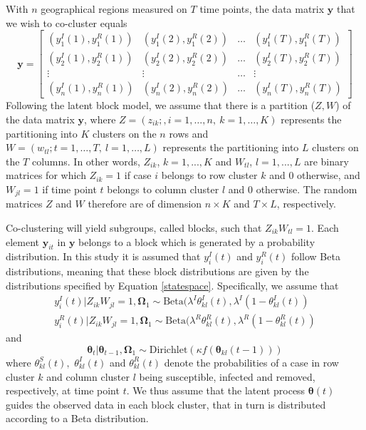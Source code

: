 \documentclass[10pt,a4paper]{article}
\begin{document}
With $n$ geographical regions measured on $T$ time points, the data matrix $\mathbf{y}$ that we wish to co-cluster equals
%
$$
\mathbf{y} = \begin{bmatrix}
	(y^I_1(1), y^R_1(1)) & (y^I_1(2), y^R_1(2)) & \ldots & (y^I_1(T), y^R_1(T))\\
	(y^I_2(1), y^R_2(1)) & (y^I_2(2), y^R_2(2)) & \ldots & (y^I_2(T), y^R_2(T))\\
	\vdots & \vdots & \ldots & \vdots \\
	(y^I_n(1), y^R_n(1)) & (y^I_n(2), y^R_n(2)) & \ldots & (y^I_n(T), y^R_n(T))
\end{bmatrix}
$$
%
Following the latent block model, we assume that there is a partition ($Z, W$) of the data matrix $\mathbf{y}$, where $Z = (z_{ik}; , i=1,\ldots, n, \: k = 1,\ldots, K)$ represents the partitioning into $K$ clusters on the $n$ rows and $W = (w_{tl}; t=1,\ldots, T, \: l=1,\ldots, L)$ represents the partitioning into $L$ clusters on the $T$ columns. In other words, $Z_{ik}$, $k = 1,..., K$ and $W_{tl}$, $l = 1,..., L$ are binary matrices for which $Z_{ik} = 1$ if case $i$ belongs to row cluster $k$ and $0$ otherwise, and $W_{jl} = 1$ if time point $t$ belongs to column cluster $l$ and $0$ otherwise. The random matrices $Z$ and $W$ therefore are of dimension $n \times K$ and $T \times L$, respectively. 

Co-clustering will yield subgroups, called blocks, such that $Z_{ik} W_{tl} = 1$. Each element $\mathbf{y}_{it}$ in $\mathbf{y}$ belongs to a block which is generated by a probability distribution. In this study it is assumed that $y_{i}^I(t)$ and $y_{i}^R(t)$ follow Beta distributions, meaning that these block distributions are given by the distributions specified by Equation \ref{statespace}. Specifically, we assume that 
%
\begin{equation}\label{statespace-observed}
	\begin{aligned}
		y_{i}^I(t) | Z_{ik}W_{jl} = 1, \boldsymbol{\Omega}_1 \sim \text{Beta}(\lambda^I \theta_{kl}^I(t), \lambda^I(1 - \theta_{kl}^I(t)) \\
		y_{i}^R(t) | Z_{ik}W_{jl} = 1, \boldsymbol{\Omega}_1 \sim \text{Beta}(\lambda^R \theta_{kl}^R(t), \lambda^R(1 - \theta_{kl}^R(t))
	\end{aligned}
\end{equation}
% 
and 
%
\begin{equation}\label{statespace-latent}
	\boldsymbol{\theta}_t | \boldsymbol{\theta}_{t-1}, \boldsymbol{\Omega}_1 \sim \text{Dirichlet}(\kappa f(\boldsymbol{\theta}_{kl}(t-1)))
\end{equation}
%
where 
%
$
\theta_{kl}^S(t),
$ 
%
$
\theta_{kl}^I(t)
$
%
and 
%
$
\theta_{kl}^R(t)
$
%
denote the probabilities of a case in row cluster $k$ and column cluster $l$ being susceptible, infected and removed, respectively, at time point $t$. We thus assume that the latent process $\boldsymbol{\theta}(t)$ guides the observed data in each block cluster, that in turn is distributed according to a Beta distribution. 
\end{document}
